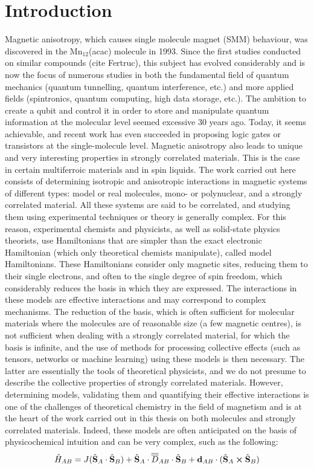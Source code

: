 \documentclass[12pt]{report}
\numberwithin{equation}{section}
\begin{document}
\chapter{Introduction}
Magnetic anisotropy, which causes single molecule magnet (SMM) behaviour, was discovered in the Mn$_{12}$(acac) molecule in 1993.\cite{sessoli_high-spin_1993} 
Since the first studies conducted on similar compounds (cite Fertruc), this subject has evolved considerably and is now the focus of numerous studies in both the fundamental field of quantum mechanics (quantum tunnelling, quantum interference, etc.) and more applied fields (spintronics, quantum computing, high data storage, etc.).
The ambition to create a qubit and control it in order to store and manipulate quantum information at the molecular level seemed excessive 30 years ago.
Today, it seems achievable, and recent work has even succeeded in proposing logic gates or transistors at the single-molecule level.
Magnetic anisotropy also leads to unique and very interesting properties in strongly correlated materials.
This is the case in certain multiferroic materials and in spin liquids. 
The work carried out here consists of determining isotropic and anisotropic interactions in magnetic systems of different types: model or real molecules, mono- or polynuclear, and a strongly correlated material.
All these systems are said to be correlated, and studying them using experimental techniques or theory is generally complex.
For this reason, experimental chemists and physicists, as well as solid-state physics theorists, use Hamiltonians that are simpler than the exact electronic Hamiltonian (which only theoretical chemists manipulate), called model Hamiltonians.
These Hamiltonians consider only magnetic sites, reducing them to their single electrons, and often to the single degree of spin freedom, which considerably reduces the basis in which they are expressed.
The interactions in these models are effective interactions and may correspond to complex mechanisms. 
The reduction of the basis, which is often sufficient for molecular materials where the molecules are of reasonable size (a few magnetic centres), is not sufficient when dealing with a strongly correlated material, for which the basis is infinite, and the use of methods for processing collective effects (such as tensors, networks or machine learning) using these models is then necessary.
The latter are essentially the tools of theoretical physicists, and we do not presume to describe the collective properties of strongly correlated materials.
However, determining models, validating them and quantifying their effective interactions is one of the challenges of theoretical chemistry in the field of magnetism and is at the heart of the work carried out in this thesis on both molecules and strongly correlated materials.
Indeed, these models are often anticipated on the basis of physicochemical intuition and can be very complex, such as the following:
\begin{equation}
    \hat{H}_{AB}=J(\hat{\vb S}_A \cdot \hat{\vb S}_B) + \hat{\vb S}_A \cdot\overline{\overline{D}}_{AB} \cdot \hat{\vb S}_B + \vb{d}_{AB} \cdot (\hat{\vb S}_A \cross \hat{\vb S}_B)
\end{equation}
\end{document}
